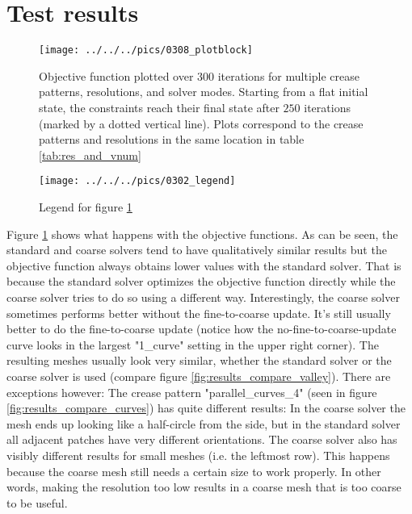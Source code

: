 \documentclass[a4paper,twoside,12pt,nochapterprefix]{scrbook}
\begin{document}
\section{Test results}\label{sec:test_results}
\begin{figure}
    \centering
    \texttt{[image: ../../../pics/0308\_plotblock]}
    \caption{Objective function plotted over $300$ iterations for multiple crease patterns, resolutions, and solver modes. Starting from a flat initial state, the constraints reach their final state after $250$ iterations (marked by a dotted vertical line). Plots correspond to the crease patterns and resolutions in the same location in table \ref{tab:res_and_vnum}}
      \label{fig:results_plotblock}
\end{figure}
\begin{figure}
    \centering
    \texttt{[image: ../../../pics/0302\_legend]}
    \caption{Legend for figure \ref{fig:results_plotblock}}
    \label{fig:results_legend}
\end{figure}
Figure \ref{fig:results_plotblock} shows what happens with the objective functions. As can be seen, the standard and coarse solvers tend to have qualitatively similar results but the objective function always obtains lower values with the standard solver. That is because the standard solver optimizes the objective function directly while the coarse solver tries to do so using a different way. Interestingly, the coarse solver sometimes performs better without the fine-to-coarse update. It's still usually better to do the fine-to-coarse update (notice how the no-fine-to-coarse-update curve looks in the largest "1\_curve" setting in the upper right corner).\newline
The resulting meshes usually look very similar, whether the standard solver or the coarse solver is used (compare figure \ref{fig:results_compare_valley}). There are exceptions however: The crease pattern "parallel\_curves\_4" (seen in figure \ref{fig:results_compare_curves}) has quite different results: In the coarse solver the mesh ends up looking like a half-circle from the side, but in the standard solver all adjacent patches have very different orientations.\newline %
The coarse solver also has visibly different results for small meshes (i.e. the leftmost row). This happens because the coarse mesh still needs a certain size to work properly. In other words, making the resolution too low results in a coarse mesh that is too coarse to be useful.\newline
\end{document}
